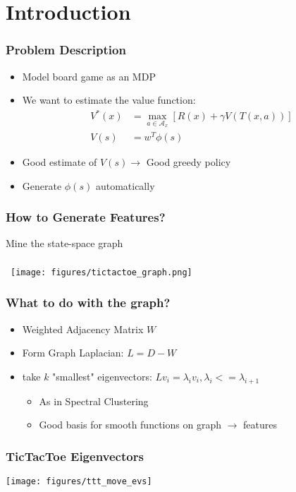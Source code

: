 \section{Introduction}

\begin{frame}
\frametitle{Problem Description}

\begin{itemize}
  \item Model board game as an MDP
  \item We want to estimate the value function:
    \begin{align*}
        V^{*}(x) &= \max_{a \in \mathcal{A}_x} [ R(x) + \gamma V(T(x, a)) ]\\
        V(s)     &= w^{T}\phi(s)
    \end{align*}
  \item Good estimate of $V(s) \rightarrow$ Good greedy policy
  \item Generate $\phi(s)$ automatically
\end{itemize}
\end{frame}

\begin{frame}
\frametitle{How to Generate Features?}
\begin{center}
Mine the state-space graph
\\ \
\\ \
\texttt{[image: figures/tictactoe\_graph.png]}
\end{center}
\end{frame}

\begin{frame}
\frametitle{What to do with the graph?}
\begin{itemize}
  \item Weighted Adjacency Matrix $W$
  \item Form Graph Laplacian: $L = D-W $
  \item take $k$ "smallest" eigenvectors: $Lv_{i} = \lambda_{i} v_{i}, \lambda_{i} <= \lambda_{i+1}$
    \begin{itemize}
        \item As in Spectral Clustering
        \item Good basis for smooth functions on graph $\rightarrow$ features 
    \end{itemize}
\end{itemize}
\end{frame}

\begin{frame}
\frametitle{TicTacToe Eigenvectors}
\texttt{[image: figures/ttt\_move\_evs]}
\end{frame}

